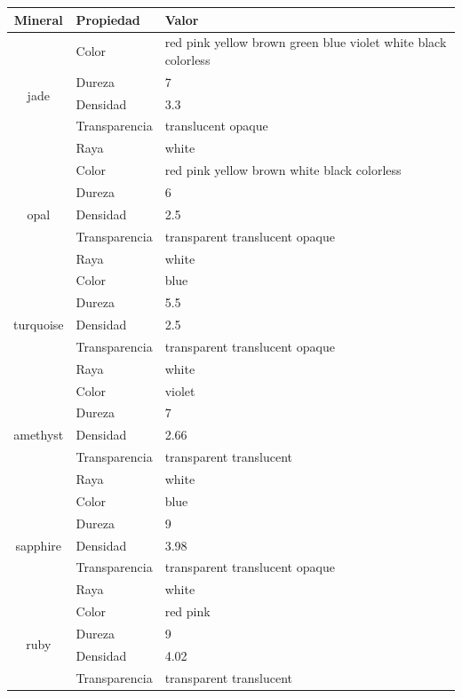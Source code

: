 \documentclass[a4paper,10pt]{article}
\begin{document}
\hspace{-1.5cm}
\begin{tabular}{|c|l|l|}
    \hline
    Mineral & Propiedad & Valor \\ \hline
    \multirow{5}{*}{jade} 
        & Color & red pink yellow brown green blue violet white black colorless \\
        & Dureza & 7 \\
        & Densidad & 3.3 \\
        & Transparencia & translucent opaque \\
        & Raya & white \\ \hline
    \multirow{5}{*}{opal} 
        & Color & red pink yellow brown white black colorless \\
        & Dureza & 6 \\
        & Densidad & 2.5 \\
        & Transparencia & transparent translucent opaque \\
        & Raya & white \\ \hline
    \multirow{5}{*}{turquoise} 
        & Color & blue \\
        & Dureza & 5.5 \\
        & Densidad & 2.5 \\
        & Transparencia & transparent translucent opaque \\
        & Raya & white \\ \hline
    \multirow{5}{*}{amethyst} 
        & Color & violet \\
        & Dureza & 7 \\
        & Densidad & 2.66 \\
        & Transparencia & transparent translucent \\
        & Raya & white \\ \hline
    \multirow{5}{*}{sapphire} 
        & Color & blue \\
        & Dureza & 9 \\
        & Densidad & 3.98 \\
        & Transparencia & transparent translucent opaque \\
        & Raya & white \\ \hline
    \multirow{5}{*}{ruby} 
        & Color & red pink \\
        & Dureza & 9 \\
        & Densidad & 4.02 \\
        & Transparencia & transparent translucent \\

\end{tabular}
\end{document}
